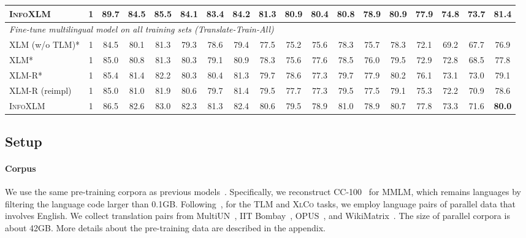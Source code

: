 \documentclass[11pt,a4paper]{article}
\newcommand\our{\textsc{InfoXLM}}
\newcommand\xlco{\textsc{XlCo}}
\begin{document}
\begin{table*}[t]
{\begin{tabular}{lccccccccccccccccc}
\our{} & 1 & 89.7 & 84.5 & 85.5 & 84.1 & 83.4 & 84.2 & 81.3 & 80.9 & 80.4 & 80.8 & 78.9 & 80.9 & 77.9 & 74.8 & 73.7 & \textbf{81.4} \\
\midrule
\multicolumn{18}{l}{\textit{Fine-tune multilingual model on all training sets (Translate-Train-All)}} \\
\midrule
\textsc{XLM} (w/o TLM)* & 1 & 84.5 & 80.1 & 81.3 & 79.3 & 78.6 & 79.4 & 77.5 & 75.2 & 75.6 & 78.3 & 75.7 & 78.3 & 72.1 & 69.2 & 67.7 & 76.9 \\
\textsc{XLM}* & 1 & 85.0 & 80.8 & 81.3 & 80.3 & 79.1 & 80.9 & 78.3 & 75.6 & 77.6 & 78.5 & 76.0 & 79.5 & 72.9 & 72.8 & 68.5 & 77.8 \\
\textsc{XLM-R}* & 1 & 85.4 & 81.4 & 82.2 & 80.3 & 80.4 & 81.3 & 79.7 & 78.6 & 77.3 & 79.7 & 77.9 & 80.2 & 76.1 & 73.1 & 73.0 & 79.1 \\
\textsc{XLM-R} (reimpl) & 1 & 85.0 & 81.0 & 81.9 & 80.6 & 79.7 & 81.4 & 79.5 & 77.7 & 77.3 & 79.5 & 77.5 & 79.1 & 75.3 & 72.2 & 70.9 & 78.6 \\
\our{} & 1 & 86.5 & 82.6 & 83.0 & 82.3 & 81.3 & 82.4 & 80.6 & 79.5 & 78.9 & 81.0 & 78.9 & 80.7 & 77.8 & 73.3 & 71.6 & \textbf{80.0} \\
\bottomrule
\end{tabular}
}
\caption{Evaluation results on XNLI cross-lingual natural language inference.
We report test accuracy in  languages.
The model number \#M=N indicates the model selection is done on each language's validation set (i.e., each language has a  different model), while \#M=1 means only one model is used for all languages.
Results with ``*'' are taken from~\citet{xlmr}.
``(reimpl)'' is our reimplementation of fine-tuning, which is the same as \our{}.
Results of \our{} and XLM-R (reimpl) are averaged over five runs.
``\xlco{}'' is the model without cross-lingual contrast.}
\label{table:xnli}
\end{table*}

\subsection{Setup}

\paragraph{Corpus}
We use the same pre-training corpora as previous models~\cite{xlmr,xlm}.
Specifically, we reconstruct CC-100~\cite{xlmr} for MMLM, which remains  languages by filtering the language code larger than 0.1GB.
Following~\cite{xlm}, for the TLM and \xlco{} tasks, we employ  language pairs of parallel data that involves English.
We collect translation pairs from MultiUN~\cite{multiun}, IIT Bombay~\cite{iit}, OPUS~\cite{opus}, and WikiMatrix~\cite{wikimatrix}.
The size of parallel corpora is about 42GB.
More details about the pre-training data are described in the appendix.
\end{document}
